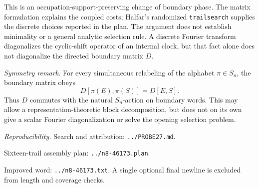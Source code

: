 \documentclass[11pt]{article}
\begin{document}
This is an occupation-support-preserving change of boundary phase. The
matrix formulation explains the coupled costs; Halfar's randomized
\texttt{trailsearch} supplies the discrete choices reported in the plan.
The argument does not establish minimality or a general analytic selection
rule. A discrete Fourier transform diagonalizes the cyclic-shift operator
of an internal clock, but that fact alone does not diagonalize the directed
boundary matrix \(D\).

\smallskip
\noindent\textit{Symmetry remark.}
For every simultaneous relabeling of the alphabet
\(\pi\in S_n\), the boundary matrix obeys
\[
D[\pi(E),\pi(S)]=D[E,S].
\]
Thus \(D\) commutes with the natural \(S_n\)-action on boundary words.
This may allow a representation-theoretic block decomposition, but does
not on its own give a scalar Fourier diagonalization or solve the opening
selection problem.

{\small\textit{Reproducibility.}
Search and attribution: \texttt{../PROBE27.md}.\par
Sixteen-trail assembly plan: \texttt{../n8-46173.plan}.\par
Improved word: \texttt{../n8-46173.txt}.
A single optional final newline is excluded from length and coverage checks.}
\end{document}
